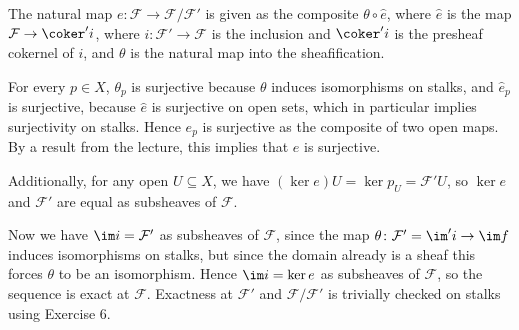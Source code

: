 The natural map $e\colon \mathcal{F}\to \mathcal{F}/\mathcal{F}'$ is
given as the composite $\theta \circ \hat{e}$, where $\hat{e}$ is
the map $\mathcal{F}\to \coker' i$, where $i\colon \mathcal{F}'\to \mathcal{F}$ is
the inclusion and $\coker' i$ is the presheaf cokernel of $i$, and
$\theta$ is the natural map into the sheafification.

For every $p \in X$, $\theta_p$ is surjective because $\theta$ induces
isomorphisms on stalks, and $\hat{e}_p$ is surjective, because
$\hat{e}$ is surjective on open sets, which in particular implies
surjectivity on stalks. Hence $e_p$ is surjective as the composite
of two open maps. By a result from the lecture, this implies that $e$
is surjective.

Additionally, for any open $U \subseteq X$, we have $(\ker e)U = \ker p_U = \mathcal{F}'U$,
so $\ker e$ and $\mathcal{F}'$ are equal as subsheaves of $\mathcal{F}$.

Now we have $\im i = \mathcal{F}'$ as subsheaves of $\mathcal{F}$, since
the map $\theta\colon \mathcal{F}' = \im' i \to \im f$ induces isomorphisms on
stalks, but since the domain already is a sheaf this forces $\theta$ to be an
isomorphism. Hence $\im i = \ker e$ as subsheaves of $\mathcal{F}$, so the sequence
is exact at $\mathcal{F}$.  Exactness at $\mathcal{F}'$ and
$\mathcal{F}/\mathcal{F}'$ is trivially checked on stalks using Exercise 6.
